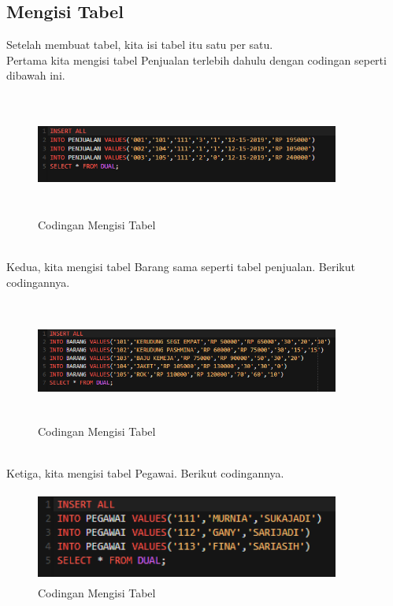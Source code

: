 \documentclass[a4paper, 12pt]{article}
\begin{document}
\begin{enumerate}
\subsection{Mengisi Tabel}
\par Setelah membuat tabel, kita isi tabel itu satu per satu. \\
Pertama kita mengisi tabel Penjualan terlebih dahulu dengan codingan seperti dibawah ini.

            \begin{figure}[!htbp]
            \centering
            \includegraphics[width=10cm,height=4cm]{gambar/1-insert.PNG}
            \caption{Codingan Mengisi Tabel}
            \label{penanda}
            \end{figure}\\
            
Kedua, kita mengisi tabel Barang sama seperti tabel penjualan. Berikut codingannya. 

            \begin{figure}[!htbp]
            \centering
            \includegraphics[width=10cm,height=4cm]{gambar/3-insert.PNG}
            \caption{Codingan Mengisi Tabel}
            \label{penanda}
            \end{figure}\\
            
Ketiga, kita mengisi tabel Pegawai. Berikut codingannya.

            \begin{figure}[!htbp]
            \centering
            \includegraphics[width=10cm,height=3cm]{gambar/2-insert.PNG}
            \caption{Codingan Mengisi Tabel}
            \label{penanda}
            \end{figure}\\
            

\end{enumerate}
\end{document}
